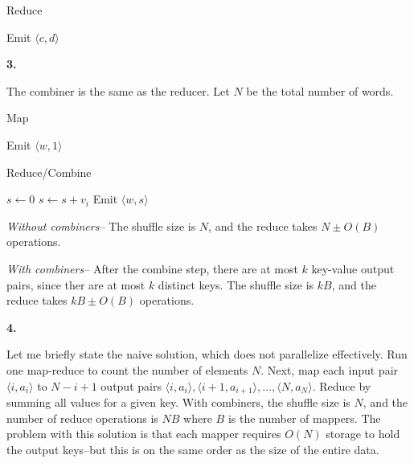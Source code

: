 \documentclass[11pt]{article}
\begin{document}
\begin{algorithm}[H]
\caption{Reduce}
\begin{algorithmic}
    \Return
  \EndIf
      \State Emit $\langle c, d \rangle$
      \State \Return
    \EndIf
  \EndFor
\EndFunction
\end{algorithmic}
\end{algorithm}

\noindent\textbf{3.}

The combiner is the same as the reducer.  Let $N$ be the total number of words.

\begin{algorithm}[H]
\caption{Map}
\begin{algorithmic}
    \State Emit $\langle w, 1\rangle$
  \EndFor
\EndFunction
\end{algorithmic}
\end{algorithm}

\begin{algorithm}[H]
\caption{Reduce/Combine}
\begin{algorithmic}
  \State $s \leftarrow 0$
    \State $s \leftarrow s + v_i$
  \EndFor
  \State Emit $\langle w, s\rangle$
\EndFunction
\end{algorithmic}
\end{algorithm}

\emph{Without combiners--}
The shuffle size is $N$, and the reduce takes $N \pm O(B)$ operations.

\emph{With combiners--}
After the combine step, there are at most $k$ key-value output pairs,
since ther are at most $k$ distinct keys.
The shuffle size is $kB$, and the reduce takes $kB \pm O(B)$ operations.

\newpage
\noindent\textbf{4.}

Let me briefly state the naive solution, which does not parallelize
effectively.  Run one map-reduce to count the number of elements $N$.
Next, map each input pair $\langle i, a_i \rangle$ to $N-i+1$ output
pairs $\langle i, a_i \rangle, \langle i+1, a_{i+1} \rangle, \hdots,
\langle N, a_N \rangle$.  Reduce by summing all values for a given
key.  With combiners, the shuffle size is $N$, and the number of
reduce operations is $NB$ where $B$ is the number of mappers.  The
problem with this solution is that each mapper requires $O(N)$ storage
to hold the output keys--but this is on the same order as the size of
the entire data.
\end{document}
